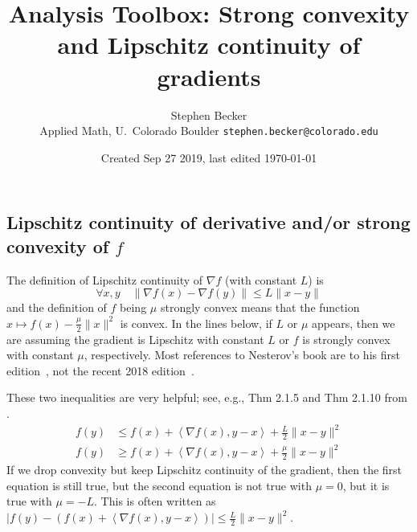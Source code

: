 \documentclass{article}
\title{Analysis Toolbox: Strong convexity and Lipschitz continuity of gradients}
\author{
Stephen Becker \\
Applied Math, U.\ Colorado Boulder
\texttt{stephen.becker@colorado.edu}
}
\date{Created Sep 27 2019, last edited \today}
\newcommand{\<}{\langle}
\renewcommand{\>}{\rangle}
\newcommand{\iprod}[2]{\left\langle #1 , #2 \right\rangle}
\begin{document}
\maketitle

\subsection*{Lipschitz continuity of derivative and/or strong convexity of $f$}
The definition of Lipschitz continuity of $\nabla f$  (with constant $L$) is
\begin{equation} \label{eq:LL}
    \forall x, y\quad \| \nabla f(x) - \nabla f(y) \| \le L \|x-y\|
\end{equation}
and the definition of $f$ being $\mu$ strongly convex means that the function $x \mapsto f(x) - \frac{\mu}{2}\|x\|^2$ is convex. In the lines below, if $L$ or $\mu$ appears, then we are assuming the gradient is Lipschitz with constant $L$ or $f$ is strongly convex with constant $\mu$, respectively. Most references to Nesterov's book are to his first edition~\cite{Nesterov_2004}, not the recent 2018  edition~\cite{Nesterov_2018}.

These two inequalities are very helpful; see, e.g., Thm 2.1.5 and Thm 2.1.10 from \cite{Nesterov_2004}.
\begin{align}
    f(y) &\le f(x) + \iprod{\nabla f(x)}{ y - x } + \frac{L}{2}\|x-y\|^2 \label{eq:L} \\
    f(y) &\ge f(x) + \iprod{\nabla f(x)}{ y - x } + \frac{\mu}{2}\|x-y\|^2 \label{eq:mu}
\end{align}
If we drop convexity but keep Lipschitz continuity of the gradient, then the first equation is still true, but the second equation is not true with $\mu=0$, but it is true with $\mu = -L$.  This is often written as
$\left| f(y) - ( f(x) + \iprod{\nabla f(x)}{ y - x } )\right| \le \frac{L}{2}\|x-y\|^2$.
\end{document}
